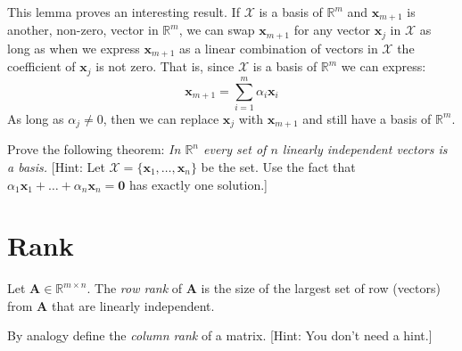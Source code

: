 \begin{remark} This lemma proves an interesting result. If $\mathcal{X}$ is a basis of $\mathbb{R}^m$ and $\mathbf{x}_{m+1}$ is another, non-zero, vector in $\mathbb{R}^m$, we can swap $\mathbf{x}_{m+1}$ for any vector $\mathbf{x}_j$ in $\mathcal{X}$ as long as when we express $\mathbf{x}_{m+1}$ as a linear combination of vectors in $\mathcal{X}$ the coefficient of $\mathbf{x}_j$ is not zero. That is, since $\mathcal{X}$ is a basis of $\mathbb{R}^m$ we can express:
\begin{displaymath}
\mathbf{x}_{m+1} = \sum_{i=1}^{m}\alpha_i\mathbf{x}_i
\end{displaymath}
As long as $\alpha_j \neq 0$, then we can replace $\mathbf{x}_j$ with $\mathbf{x}_{m+1}$ and still have a basis of $\mathbb{R}^m$.
\end{remark}

\begin{exercise} Prove the following theorem: \textit{In $\mathbb{R}^n$ every set of $n$ linearly independent vectors is a basis.} [Hint: Let $\mathcal{X} = \{\mathbf{x}_1,\dots,\mathbf{x}_n\}$ be the set. Use the fact that $\alpha_1 \mathbf{x}_1 + \dots + \alpha_n\mathbf{x}_n = \mathbf{0}$ has exactly one solution.]
\end{exercise}


\section{Rank}
\begin{definition} Let $\mathbf{A} \in \mathbb{R}^{m \times n}$. The \textit{row rank} of $\mathbf{A}$ is the size of the largest set of row (vectors) from $\mathbf{A}$ that are linearly independent.
\end{definition}

\begin{exercise}By analogy define the \textit{column rank} of a matrix. [Hint: You don't need a hint.]
\end{exercise}

